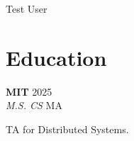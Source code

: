 \documentclass[10pt]{article}
\newcommand{\resumeItem}[1]{\item\small{#1}}
\newcommand{\resumeSubheading}[4]{\item \textbf{#1} #2 \\ \textit{#3} #4}
\begin{document}
\begin{center}
{\huge Test User}
\end{center}

\section{Education}
    \resumeSubheading{MIT}{2025}{M.S. CS}{MA}
        \resumeItem{TA for Distributed Systems.}
\end{document}
